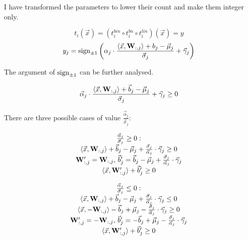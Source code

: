 \documentclass{fithesis}
\begin{document}
I have transformed the parameters to lower their count and make them integer only.

\begin{equation*}
    t_i(\vec x) = (t_i^{bin} \circ t_i^{bn} \circ t_i^{lin})(\vec x) = y
\end{equation*}
\begin{equation*}
    y_j = \mathrm{sign}_{\pm 1}\left( \alpha_j \cdot \frac{\langle \vec x, \mathbf{W}_{:, j}\rangle + b_j - \vec \mu_j}{\vec \sigma_j} + \vec \gamma_j \right)
\end{equation*}

The argument of $\mathrm{sign}_{\pm 1}$ can be further analysed.

\begin{equation*}
    \vec \alpha_j \cdot \frac{\langle \vec x, \mathbf{W}_{:, j}\rangle + \vec b_j - \vec \mu_j}{\vec \sigma_j} + \vec \gamma_j \geq 0
\end{equation*}

There are three possible cases of value $\frac{\vec \alpha_j}{\vec \sigma_j}$:

\begin{equation*}
    \begin{matrix}
        \frac{\vec\alpha_j}{\vec\sigma_j} \geq 0: \\
        \langle \vec x, \mathbf{W}_{:, j}\rangle + \vec b_j - \vec \mu_j + \frac{\vec \sigma_j}{\vec\alpha_j}\cdot \vec \gamma_j \geq 0\\
        \mathbf{W}'_{:, j} = \mathbf{W}_{:, j}, \,
        \vec b'_j = \vec b_j - \vec\mu_j + \frac{\vec\sigma_j}{\vec\alpha_j}\cdot \vec\gamma_j\\
        \langle \vec x, \mathbf{W}'_{:, j}\rangle + \vec b'_j \geq 0\\
    \end{matrix}
\end{equation*}

\begin{equation*}
    \begin{matrix}
        \frac{\vec\alpha_j}{\vec\sigma_j} \leq 0: \\
        \langle \vec x, \mathbf{W}_{:, j}\rangle + \vec b_j - \vec \mu_j + \frac{\vec \sigma_j}{\vec\alpha_j}\cdot \vec \gamma_j \leq 0 \\
        \langle \vec x, -\mathbf{W}_{:, j}\rangle - \vec b_j + \vec \mu_j - \frac{\vec \sigma_j}{\vec\alpha_j}\cdot \vec \gamma_j \geq 0\\
        \mathbf{W}'_{:, j} = -\mathbf{W}_{:, j}, \,
        \vec b'_j = -\vec b_j + \vec\mu_j - \frac{\vec\sigma_j}{\vec\alpha_j}\cdot \vec\gamma_j\\
        \langle \vec x, \mathbf{W}'_{:, j}\rangle + \vec b'_j \geq 0\\
    \end{matrix}
\end{equation*}
\end{document}
